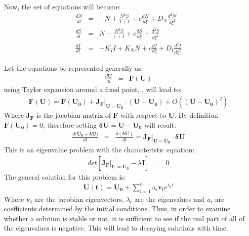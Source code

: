 \documentclass[aps,pre,floats,floatfix,twocolumn]{revtex4-1}
\newcommand{\beq}{\begin{eqnarray}}
\newcommand{\eeq}{\end{eqnarray}}
\begin{document}
Now, the set of equations will become:
\begin{eqnarray}
      \frac{dN}{dt}&=&-N+\frac{N^2S}{1+I}+c\frac{dN}{d\xi}+D_N\frac{d^2N}{d\xi^2} \\\nonumber
     \frac{dS}{dt}&=&N-\frac{N^2S}{1+I}+c\frac{dS}{d\xi}+\frac{d^2S}{d\xi^2} \\\nonumber
      \frac{dI}{dt}&=&-K_II+K_NN+c\frac{dI}{d\xi}+D_I\frac{d^2I}{d\xi^2}
\end{eqnarray}

Let the equations be represented generally as:
\beq
\frac{d\bm{U}}{dt}&=&\bm{F(U)}
\eeq
using Taylor expansion around a fixed point, , will lead to:
\beq 
\bm{F(U)=F(U_0)+\left.J_F\right |_{U=U_0}\cdot(U-U_0)}+O((\bm{U-U_0})^2)
\eeq
Where $\bm{J_F}$ is the jacobian matrix of $\bm{F}$ with respect to $\bm{U}$. By definition $\bm{F(U_0)}=0$, therefore setting $\bm{\delta U=U-U_0}$ will result:
\beq
\frac{d(\bm{U_0+\delta U)}}{dt}&=&\frac{d\bm{(\delta U)}}{dt}=\left.\bm{J_F}\right.\bm{|_{U=U_0}}\cdot\bm{\delta U}
\eeq
This is an eigenvalue problem with the characteristic equation:
\beq
det[\left.\bm{J_F}\right.\bm{|_{U=U_0}}-\lambda\bm{I}]&=&0
\eeq
The general solution for this problem is:
\beq
\bm{U(t)=U_0+}\sum_{i=1}^{n} a_i\bm{v_i}e^{\lambda_it}
\eeq
Where $\bm{v_i}$ are the jacobian eigenvectors, $\lambda_i$ are the eigenvalues and $a_i$ are coefficients determined by the initial conditions.
Thus, in order to examine whether a solution is stable or not, it is sufficient to see if the real part of all of the eigenvalues is negative. This will lead to decaying solutions with time.
\end{document}

